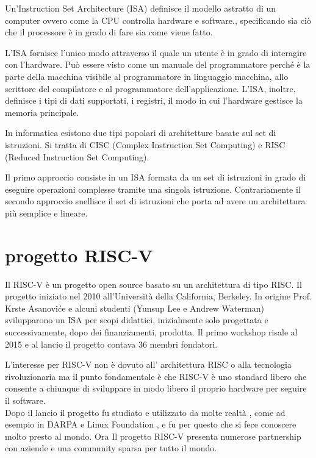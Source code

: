\documentclass[12pt,a4paper]{report}
\begin{document}
Un'Instruction Set Architecture (ISA) definisce il modello astratto di un computer ovvero come la CPU controlla hardware e software., specificando sia ciò che il processore è in grado di fare sia come viene fatto.

L'ISA fornisce l'unico modo attraverso il quale un utente è in grado di interagire con l'hardware. Può essere visto come un manuale del programmatore perché è la parte della macchina visibile al programmatore in linguaggio macchina,  allo scrittore del compilatore e al programmatore dell'applicazione.
L'ISA, inoltre, definisce i tipi di dati supportati, i registri, il modo in cui l'hardware gestisce la memoria principale. 

In informatica esistono due tipi popolari di architetture basate sul set di istruzioni. Si tratta di CISC (Complex Instruction Set Computing) e RISC (Reduced Instruction Set Computing).


Il primo approccio consiste in un ISA formata da un set di istruzioni in grado di eseguire operazioni complesse tramite una singola istruzione. Contrariamente il secondo approccio snellisce il set di istruzioni che porta ad avere un architettura più semplice e lineare.

\section{progetto RISC-V}
Il RISC-V è un progetto open source basato su un architettura di tipo RISC. Il progetto iniziato nel 2010 all'Università della California, Berkeley. In origine Prof. Krste Asanoviće e alcuni studenti (Yunsup Lee e Andrew Waterman) svilupparono un ISA per scopi didattici, inizialmente solo progettata e successivamente, dopo dei finanziamenti, prodotta. Il primo workshop risale al 2015 e al lancio il progetto contava 36 membri fondatori.

L'interesse per RISC-V non è dovuto all' architettura RISC o alla tecnologia rivoluzionaria ma il punto fondamentale è che RISC-V è uno standard libero che consente a chiunque di sviluppare in modo libero il proprio hardware per seguire il software.\\

Dopo il lancio il progetto fu studiato e utilizzato da molte realtà , come ad esempio in DARPA e Linux Foundation ,  e fu per questo che si fece conoscere molto presto al mondo.  Ora Il progetto RISC-V presenta numerose partnership con aziende e una community sparsa per tutto  il mondo.
\end{document}
